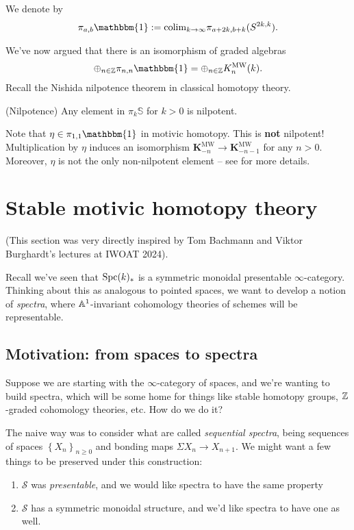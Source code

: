 \documentclass[11pt,openany]{book}
\providecommand{\MW}{\mathrm{MW}}
\providecommand{\KMW}{\mathbf{K}^\mathrm{MW}}
\begin{document}
\begin{notation} We denote by
\begin{align*}
    \pi_{a,b} \mathbbm{1} := \colim_{k\to \infty} \pi_{a + 2k, b + k} (S^{2k,k}).
\end{align*}
\end{notation}


We've now argued that there is an isomorphism of graded algebras 
\begin{align*}
    \oplus_{n\in \Z}\pi_{n,n} \mathbbm{1} = \oplus_{n\in \Z} K^\MW_n(k).
\end{align*}
%
Recall the Nishida nilpotence theorem in classical homotopy theory.

\begin{theorem} (Nilpotence) Any element in $\pi_k \mathbb{S}$ for $k>0$ is nilpotent.
\end{theorem}

Note that $\eta \in \pi_{1,1} \mathbbm{1}$ in motivic homotopy. This is \textbf{not} nilpotent! Multiplication by $\eta$ induces an isomorphism $\KMW_{-n} \to \KMW_{-n-1}$ for any $n>0$. Moreover, $\eta$ is not the only non-nilpotent element -- see \cite{GuillouIsaksen} for more details.

\section{Stable motivic homotopy theory}

(This section was very directly inspired by Tom Bachmann and Viktor Burghardt's lectures at IWOAT 2024).

Recall we've seen that $\mathrm{Spc}(k)_\ast$ is a symmetric monoidal presentable $\infty$-category. Thinking about this as analogous to pointed spaces, we want to develop a notion of \textit{spectra}, where $\mathbb{A}^1$-invariant cohomology theories of schemes will be representable.

\subsection{Motivation: from spaces to spectra}

Suppose we are starting with the $\infty$-category of spaces, and we're wanting to build spectra, which will be some home for things like stable homotopy groups, $\mathbb{Z}$-graded cohomology theories, etc. How do we do it?

The naive way was to consider what are called \textit{sequential spectra}, being sequences of spaces $\left\{ X_n \right\}_{n \ge 0}$ and bonding maps $\Sigma X_n \to X_{n+1}$. We might want a few things to be preserved under this construction:
\begin{enumerate}
    \item $\mathcal{S}$ was \textit{presentable}, and we would like spectra to have the same property
    \item $\mathcal{S}$ has a symmetric monoidal structure, and we'd like spectra to have one as well.
\end{enumerate}
\end{document}
